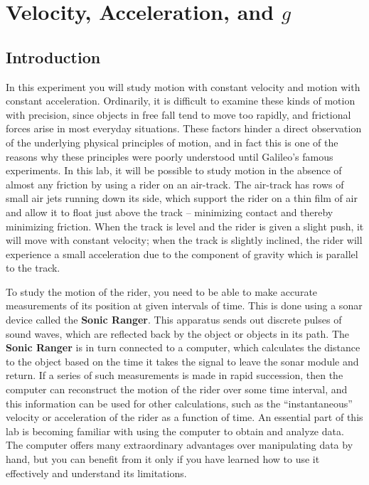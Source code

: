 \chapter{Velocity, Acceleration, and $g$} \label{chap:velocity}
\section{Introduction}

In this experiment you will study motion with constant velocity and motion with constant acceleration.  Ordinarily, it is difficult to examine these kinds of motion with precision, since objects in free fall tend to move too rapidly, and frictional forces arise in most everyday situations.  These factors hinder a direct observation of the underlying physical principles of motion, and in fact this is one of the reasons why these principles were poorly understood until Galileo's famous experiments.  In this lab, it will be possible to study motion in the absence of almost any friction by using a rider on an air-track.  The air-track has rows of small air jets running down its side, which support the rider on a thin film of air and allow it to float just above the track -- minimizing contact and thereby minimizing friction.  When the track is level and the rider is given a slight push, it will move with constant velocity; when the track is slightly inclined, the rider will experience a small acceleration due to the component of gravity which is parallel to the track. \myskip

To study the motion of the rider, you need to be able to make accurate measurements of its position at given intervals of time.  This is done using a sonar device called the \textbf{Sonic Ranger}. This apparatus sends out discrete pulses of sound waves, which are reflected back by the object or objects in its path. The \textbf{Sonic Ranger} is in turn connected to a computer, which calculates the distance to the object based on the time it takes the signal to leave the sonar module and return.  If a series of such measurements is made in rapid succession, then the computer can reconstruct the motion of the rider over some time interval, and this information can be used for other calculations, such as the ``instantaneous'' velocity or acceleration of the rider as a function of time.  An essential part of this lab is becoming familiar with using the computer to obtain and analyze data.  The computer offers many extraordinary advantages over manipulating data by hand, but you can benefit from it only if you have learned how to use it effectively and understand its limitations.

